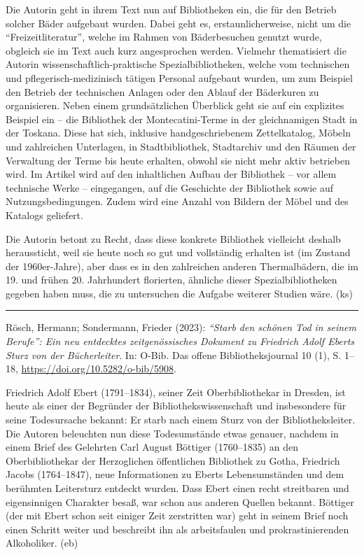 \documentclass[a4paper,
fontsize=11pt,
oneside,
numbers=noperiodatend,
parskip=half-,
bibliography=totoc,
final
]{scrartcl}
\begin{document}
Die Autorin geht in ihrem Text nun auf Bibliotheken ein, die für den
Betrieb solcher Bäder aufgebaut wurden. Dabei geht es,
erstaunlicherweise, nicht um die \enquote{Freizeitliteratur}, welche im
Rahmen von Bäderbesuchen genutzt wurde, obgleich sie im Text auch kurz
angesprochen werden. Vielmehr thematisiert die Autorin
wissenschaftlich-praktische Spezialbibliotheken, welche vom technischen
und pflegerisch-medizinisch tätigen Personal aufgebaut wurden, um zum
Beispiel den Betrieb der technischen Anlagen oder den Ablauf der
Bäderkuren zu organisieren. Neben einem grundsätzlichen Überblick geht
sie auf ein explizites Beispiel ein -- die Bibliothek der
Montecatini-Terme in der gleichnamigen Stadt in der Toskana. Diese hat
sich, inklusive handgeschriebenem Zettelkatalog, Möbeln und zahlreichen
Unterlagen, in Stadtbibliothek, Stadtarchiv und den Räumen der
Verwaltung der Terme bis heute erhalten, obwohl sie nicht mehr aktiv
betrieben wird. Im Artikel wird auf den inhaltlichen Aufbau der
Bibliothek -- vor allem technische Werke -- eingegangen, auf die
Geschichte der Bibliothek sowie auf Nutzungsbedingungen. Zudem wird eine
Anzahl von Bildern der Möbel und des Katalogs geliefert.

Die Autorin betont zu Recht, dass diese konkrete Bibliothek vielleicht
deshalb heraussticht, weil sie heute noch so gut und vollständig
erhalten ist (im Zustand der 1960er-Jahre), aber dass es in den
zahlreichen anderen Thermalbädern, die im 19. und frühen 20. Jahrhundert
florierten, ähnliche dieser Spezialbibliotheken gegeben haben muss, die
zu untersuchen die Aufgabe weiterer Studien wäre. (ks)

\begin{center}\rule{0.5\linewidth}{0.5pt}\end{center}

Rösch, Hermann; Sondermann, Frieder (2023): \emph{\enquote{Starb den
schönen Tod in seinem Berufe}: Ein neu entdecktes zeitgenössisches
Dokument zu Friedrich Adolf Eberts Sturz von der Bücherleiter}. In:
O-Bib. Das offene Bibliotheksjournal 10 (1), S. 1--18,
\url{https://doi.org/10.5282/o-bib/5908}.

Friedrich Adolf Ebert (1791--1834), seiner Zeit Oberbibliothekar in
Dresden, ist heute als einer der Begründer der Bibliothekswissenschaft
und insbesondere für seine Todesursache bekannt: Er starb nach einem
Sturz von der Bibliotheksleiter. Die Autoren beleuchten nun diese
Todesumstände etwas genauer, nachdem in einem Brief des Gelehrten Carl
August Böttiger (1760--1835) an den Oberbibliothekar der Herzoglichen
öffentlichen Bibliothek zu Gotha, Friedrich Jacobs (1764--1847), neue
Informationen zu Eberts Lebensumständen und dem berühmten Leitersturz
entdeckt wurden. Dass Ebert einen recht streitbaren und eigensinnigen
Charakter besaß, war schon aus anderen Quellen bekannt. Böttiger (der
mit Ebert schon seit einiger Zeit zerstritten war) geht in seinem Brief
noch einen Schritt weiter und beschreibt ihn als arbeitsfaulen und
prokrastinierenden Alkoholiker. (eb)
\end{document}
